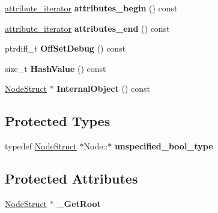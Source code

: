 \begin{DoxyCompactItemize}
\item 
\hypertarget{classphys_1_1xml_1_1Node_a601285bed116eb5d63cea9a8d117e5b7}{
\hyperlink{classphys_1_1xml_1_1AttributeIterator}{attribute\_\-iterator} {\bfseries attributes\_\-begin} () const }
\label{d7/d0a/classphys_1_1xml_1_1Node_a601285bed116eb5d63cea9a8d117e5b7}

\item 
\hypertarget{classphys_1_1xml_1_1Node_a9af9e0bff5b8ed06bc40861dccb6b4ec}{
\hyperlink{classphys_1_1xml_1_1AttributeIterator}{attribute\_\-iterator} {\bfseries attributes\_\-end} () const }
\label{d7/d0a/classphys_1_1xml_1_1Node_a9af9e0bff5b8ed06bc40861dccb6b4ec}

\item 
\hypertarget{classphys_1_1xml_1_1Node_a3c29eb5ecbe37642f29ccdd0be3efbe3}{
ptrdiff\_\-t {\bfseries OffSetDebug} () const }
\label{d7/d0a/classphys_1_1xml_1_1Node_a3c29eb5ecbe37642f29ccdd0be3efbe3}

\item 
\hypertarget{classphys_1_1xml_1_1Node_a935f818f5266d68c9d01eab52590f119}{
size\_\-t {\bfseries HashValue} () const }
\label{d7/d0a/classphys_1_1xml_1_1Node_a935f818f5266d68c9d01eab52590f119}

\item 
\hypertarget{classphys_1_1xml_1_1Node_a403f76627bf3bd70b78833ab90340cf6}{
\hyperlink{structphys_1_1xml_1_1NodeStruct}{NodeStruct} $\ast$ {\bfseries InternalObject} () const }
\label{d7/d0a/classphys_1_1xml_1_1Node_a403f76627bf3bd70b78833ab90340cf6}

\end{DoxyCompactItemize}
\subsection*{Protected Types}
\begin{DoxyCompactItemize}
\item 
\hypertarget{classphys_1_1xml_1_1Node_abace2c2c7e70431d920579917417c1e4}{
typedef \hyperlink{structphys_1_1xml_1_1NodeStruct}{NodeStruct} $\ast$Node::$\ast$ {\bfseries unspecified\_\-bool\_\-type}}
\label{d7/d0a/classphys_1_1xml_1_1Node_abace2c2c7e70431d920579917417c1e4}

\end{DoxyCompactItemize}
\subsection*{Protected Attributes}
\begin{DoxyCompactItemize}
\item 
\hypertarget{classphys_1_1xml_1_1Node_a709eb0cd1c82c1d8e50831dec6c96419}{
\hyperlink{structphys_1_1xml_1_1NodeStruct}{NodeStruct} $\ast$ {\bfseries \_\-GetRoot}}
\label{d7/d0a/classphys_1_1xml_1_1Node_a709eb0cd1c82c1d8e50831dec6c96419}

\end{DoxyCompactItemize}
